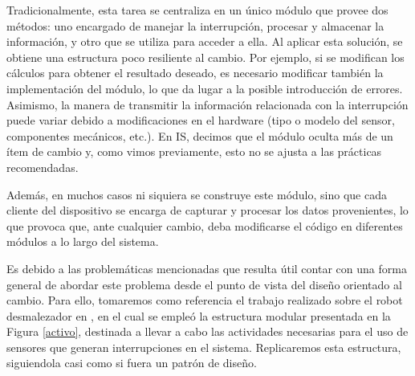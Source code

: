 Tradicionalmente, esta tarea se centraliza en un único módulo que provee dos métodos: uno encargado de manejar la interrupción, procesar y almacenar la información, y otro que se utiliza para acceder a ella. Al aplicar esta solución, se obtiene una estructura poco resiliente al cambio. Por ejemplo, si se modifican los cálculos para obtener el resultado deseado, es necesario modificar también la implementación del módulo, lo que da lugar a la posible introducción de errores. Asimismo, la manera de transmitir la información relacionada con la interrupción puede variar debido a modificaciones en el hardware (tipo o modelo del sensor, componentes mecánicos, etc.). En \gls{IS}, decimos que el módulo oculta más de un ítem de cambio y, como vimos previamente, esto no se ajusta a las prácticas recomendadas.

Además, en muchos casos ni siquiera se construye este módulo, sino que cada cliente del dispositivo se encarga de capturar y procesar los datos provenientes, lo que provoca que, ante cualquier cambio, deba modificarse el código en diferentes módulos a lo largo del sistema.

Es debido a las problemáticas mencionadas que resulta útil contar con una forma general de abordar este problema desde el punto de vista del diseño orientado al cambio. Para ello, tomaremos como referencia el trabajo realizado sobre el robot desmalezador en \cite{paperPomponio}, en el cual se empleó la estructura modular presentada en la Figura \ref{activo}, destinada a llevar a cabo las actividades necesarias para el uso de sensores que generan interrupciones en el sistema. Replicaremos esta estructura, siguiendola casi como si fuera un patrón de diseño.

